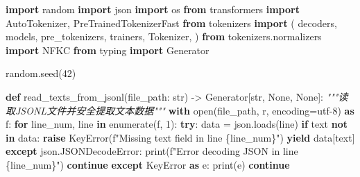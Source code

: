 \documentclass[
]{article}
\newenvironment{Shaded}{}{}
\newcommand{\BuiltInTok}[1]{\textcolor[rgb]{0.00,0.50,0.00}{#1}}
\newcommand{\CommentTok}[1]{\textcolor[rgb]{0.38,0.63,0.69}{\textit{#1}}}
\newcommand{\ControlFlowTok}[1]{\textcolor[rgb]{0.00,0.44,0.13}{\textbf{#1}}}
\newcommand{\DecValTok}[1]{\textcolor[rgb]{0.25,0.63,0.44}{#1}}
\newcommand{\ImportTok}[1]{\textcolor[rgb]{0.00,0.50,0.00}{\textbf{#1}}}
\newcommand{\KeywordTok}[1]{\textcolor[rgb]{0.00,0.44,0.13}{\textbf{#1}}}
\newcommand{\NormalTok}[1]{#1}
\newcommand{\OperatorTok}[1]{\textcolor[rgb]{0.40,0.40,0.40}{#1}}
\newcommand{\PreprocessorTok}[1]{\textcolor[rgb]{0.74,0.48,0.00}{#1}}
\newcommand{\SpecialCharTok}[1]{\textcolor[rgb]{0.25,0.44,0.63}{#1}}
\newcommand{\SpecialStringTok}[1]{\textcolor[rgb]{0.73,0.40,0.53}{#1}}
\newcommand{\StringTok}[1]{\textcolor[rgb]{0.25,0.44,0.63}{#1}}
\newcommand{\VariableTok}[1]{\textcolor[rgb]{0.10,0.09,0.49}{#1}}
\begin{document}
\begin{Shaded}
\begin{Highlighting}[]
\ImportTok{import}\NormalTok{ random}
\ImportTok{import}\NormalTok{ json}
\ImportTok{import}\NormalTok{ os}
\ImportTok{from}\NormalTok{ transformers }\ImportTok{import}\NormalTok{ AutoTokenizer, PreTrainedTokenizerFast}
\ImportTok{from}\NormalTok{ tokenizers }\ImportTok{import}\NormalTok{ (}
\NormalTok{    decoders,}
\NormalTok{    models,}
\NormalTok{    pre\_tokenizers,}
\NormalTok{    trainers,}
\NormalTok{    Tokenizer,}
\NormalTok{)}
\ImportTok{from}\NormalTok{ tokenizers.normalizers }\ImportTok{import}\NormalTok{ NFKC}
\ImportTok{from}\NormalTok{ typing }\ImportTok{import}\NormalTok{ Generator}

\NormalTok{random.seed(}\DecValTok{42}\NormalTok{)}

\KeywordTok{def}\NormalTok{ read\_texts\_from\_jsonl(file\_path: }\BuiltInTok{str}\NormalTok{) }\OperatorTok{{-}\textgreater{}}\NormalTok{ Generator[}\BuiltInTok{str}\NormalTok{, }\VariableTok{None}\NormalTok{, }\VariableTok{None}\NormalTok{]:}
    \CommentTok{"""读取JSONL文件并安全提取文本数据"""}
    \ControlFlowTok{with} \BuiltInTok{open}\NormalTok{(file\_path, }\StringTok{\textquotesingle{}r\textquotesingle{}}\NormalTok{, encoding}\OperatorTok{=}\StringTok{\textquotesingle{}utf{-}8\textquotesingle{}}\NormalTok{) }\ImportTok{as}\NormalTok{ f:}
        \ControlFlowTok{for}\NormalTok{ line\_num, line }\KeywordTok{in} \BuiltInTok{enumerate}\NormalTok{(f, }\DecValTok{1}\NormalTok{):}
            \ControlFlowTok{try}\NormalTok{:}
\NormalTok{                data }\OperatorTok{=}\NormalTok{ json.loads(line)}
                \ControlFlowTok{if} \StringTok{\textquotesingle{}text\textquotesingle{}} \KeywordTok{not} \KeywordTok{in}\NormalTok{ data:}
                    \ControlFlowTok{raise} \PreprocessorTok{KeyError}\NormalTok{(}\SpecialStringTok{f"Missing \textquotesingle{}text\textquotesingle{} field in line }\SpecialCharTok{\{}\NormalTok{line\_num}\SpecialCharTok{\}}\SpecialStringTok{"}\NormalTok{)}
                \ControlFlowTok{yield}\NormalTok{ data[}\StringTok{\textquotesingle{}text\textquotesingle{}}\NormalTok{]}
            \ControlFlowTok{except}\NormalTok{ json.JSONDecodeError:}
                \BuiltInTok{print}\NormalTok{(}\SpecialStringTok{f"Error decoding JSON in line }\SpecialCharTok{\{}\NormalTok{line\_num}\SpecialCharTok{\}}\SpecialStringTok{"}\NormalTok{)}
                \ControlFlowTok{continue}
            \ControlFlowTok{except} \PreprocessorTok{KeyError} \ImportTok{as}\NormalTok{ e:}
                \BuiltInTok{print}\NormalTok{(e)}
                \ControlFlowTok{continue}


\end{Highlighting}
\end{Shaded}
\end{document}
